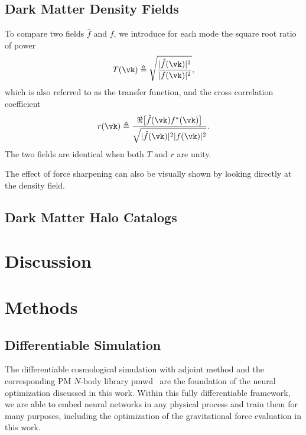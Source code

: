 \documentclass[modern, trackchanges, dvipsnames]{aastex631}
\newcommand{\pmwd}{{\usefont{T1}{nova}{m}{sl}pmwd}}
\begin{document}
\subsection{Dark Matter Density Fields}

To compare two fields $\hat f$ and $f$, we introduce for each mode the square
root ratio of power
%
\begin{equation}
T(\vk) \triangleq
\sqrt{\frac{|\hat f(\vk)|^2}{|f(\vk)|^2}},
\label{T}
\end{equation}
%
which is also referred to as the transfer function, and the cross correlation
coefficient
%
\begin{equation}
r(\vk) \triangleq
\frac{\Re \bigl[ \hat f(\vk) f^*(\vk) \bigr]}
     {\sqrt{|\hat f(\vk)|^2 |f(\vk)|^2}}.
\label{r}
\end{equation}
%
The two fields are identical when both $T$ and $r$ are unity.

The effect of force sharpening can also be visually shown by looking directly at
the density field.

\subsection{Dark Matter Halo Catalogs}


\vspace{1em}
\section{Discussion}


\vspace{1em}
\section{Methods}


\vspace{1em}
\subsection{Differentiable Simulation}
\label{sec:pmwd}

The differentiable cosmological simulation with adjoint method \citep{Li2022a}
and the corresponding PM $N$-body library \pmwd\ \citep{Li2022b} are the
foundation of the neural optimization discussed in this work.
Within this fully differentiable framework, we are able to embed neural networks
in any physical process and train them for many purposes, including the
optimization of the gravitational force evaluation in this work.
\end{document}
